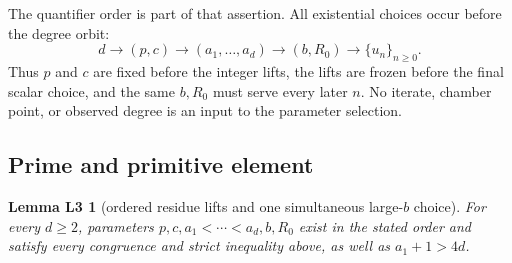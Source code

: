 \documentclass[11pt,letterpaper]{article}
\theoremstyle{plain}
\newtheorem*{lemLthree}{Lemma L3}
\begin{document}
The quantifier order is part of that assertion.  All existential choices occur before the degree orbit:
\[
d\longrightarrow(p,c)\longrightarrow
(a_1,\ldots,a_d)\longrightarrow(b,R_0)
\longrightarrow\{u_n\}_{n\geq0}.
\]
Thus $p$ and $c$ are fixed before the integer lifts, the lifts are frozen before the final scalar choice, and the same $b,R_0$ must serve every later $n$.  No iterate, chamber point, or observed degree is an input to the parameter selection.

\subsection{Prime and primitive element}

\begin{lemLthree}[ordered residue lifts and one simultaneous large-$b$ choice]
For every $d\geq2$, parameters $p,c,a_1<\cdots<a_d,b,R_0$ exist in the stated order and satisfy every congruence and strict inequality above, as well as $a_1+1>4d$.
\end{lemLthree}
\end{document}
